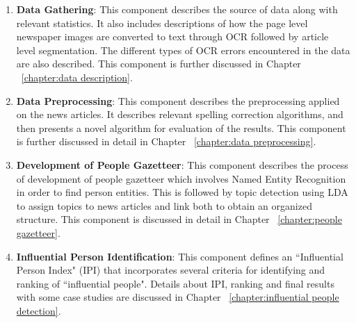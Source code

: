 \begin{enumerate}
\item \textbf {Data Gathering}:  
This component describes the source of data along with relevant statistics. It also includes descriptions of how the page level newspaper images are converted to text through OCR followed by article level segmentation. The different types of OCR errors encountered in the data are also described. This component is further discussed in Chapter ~\ref{chapter:data description}.

\item \textbf {Data Preprocessing}:
This component describes the preprocessing applied on the news articles. It describes relevant spelling correction algorithms, and then presents a novel algorithm for evaluation of the results. This component is further discussed in detail in Chapter ~\ref{chapter:data preprocessing}.

\item \textbf {Development of People Gazetteer}:
This component describes the process of development of people gazetteer which involves Named Entity Recognition in order to find person entities. This is followed by topic detection using LDA to assign topics to news articles and link both to obtain an organized structure. This component is discussed in detail in Chapter ~\ref{chapter:people gazetteer}.

\item \textbf {Influential Person Identification}:
This component defines an ``Influential Person Index" (IPI) that incorporates several criteria for identifying and ranking of ``influential people". Details about IPI, ranking and final results with some case studies are discussed in Chapter ~\ref{chapter:influential people detection}.

\end{enumerate}
 




